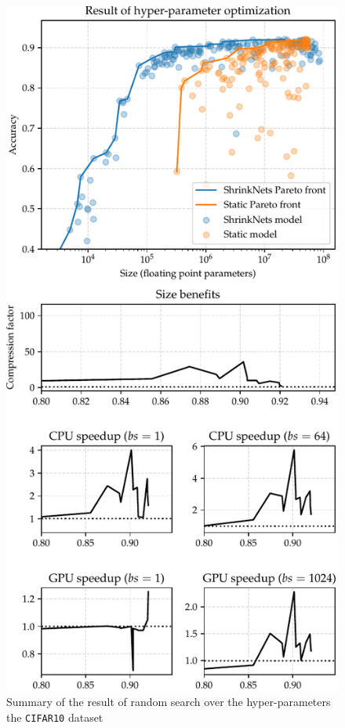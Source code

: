\begin{figure}
\begin{center}
\end{center}
\vspace*{-4mm}
\end{figure}

\begin{figure}
\begin{center}
\includegraphics[width=\columnwidth]{CIFAR10_VGG_summary}
\vspace*{-5mm}
\caption{\label{figure_CIFAR10} Summary of the result of random
search over the hyper-parameters the \texttt{CIFAR10} dataset}
\end{center}
\vspace*{-4mm}
\end{figure}

